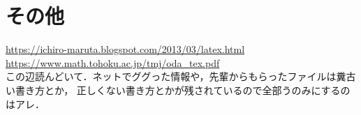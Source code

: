 \documentclass[lualatex,a4paper,ja = standard, twoside, twocolumn]{bxjsarticle}
\begin{document}
\section{その他}
  \url{https://ichiro-maruta.blogspot.com/2013/03/latex.html} \\
  \url{https://www.math.tohoku.ac.jp/tmj/oda_tex.pdf}\\
  この辺読んどいて．ネットでググった情報や，先輩からもらったファイルは糞古い書き方とか，
  正しくない書き方とかが残されているので全部うのみにするのはアレ．
\end{document}
